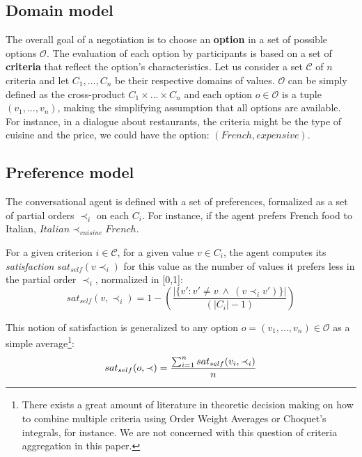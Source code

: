 \documentclass{llncs}
\begin{document}
		\subsection{Domain model}
		The overall goal of a negotiation is to choose an \textbf{option} in a set of possible options $\mathcal{O}$. The evaluation of each option by participants is based on a set of \textbf{criteria} that reflect the option's characteristics. Let us consider a set $\mathcal{C}$ of $n$ criteria and let $C_1,\ldots,C_n$ be their respective domains of values. $\mathcal{O}$ can be simply defined as the cross-product $C_1\times\ldots\times C_n$ and each option $o\in\mathcal{O}$ is a tuple $(v_1,\ldots,v_n)$, making the simplifying assumption that all options are available. For instance, in a dialogue about restaurants, the criteria might be the type of cuisine and the price, we could have the option: $(French,expensive)$.
		
		\subsection{Preference model} 
		The conversational agent is defined with a set of preferences, formalized as a set of partial orders $\prec_i$ on each $C_i$. For instance, if the agent prefers French food to Italian, $Italian\prec_{cuisine}French$.
		
		For a given criterion $i\in \mathcal{C}$, for a given value $v\in C_i$, the agent computes its \emph{satisfaction} $sat_{self}(v \prec_i)$ for this value as the number of values it prefers less in the partial order $\prec_i$, normalized in [0,1]:
		\vspace{-.5em} 
		\begin{equation}
		sat_{self}(v, \prec_i) =	1 - \left( \frac{|\{v' : v' \neq v \  \wedge \ (v \prec_i v')\}| }{( |C_i| - 1 )}\right)
		\end{equation}
		
		This notion of satisfaction is generalized to any option $o= (v_1, \ldots, v_n)\in \mathcal{O}$ as a simple average\footnote{There exists a great amount of literature in theoretic decision making on how to combine multiple criteria using Order Weight Averages or Choquet's integrals, for instance. We are not concerned with this question of criteria aggregation in this paper.}:
		\vspace{-1em} 
		\begin{equation}
		sat_{self}(o, \prec) = \frac{\sum_{i=1}^{n} sat_{self}(v_i, \prec_i) }{n}
		\vspace{-1.5em} 
		\end{equation}
		
\end{document}
